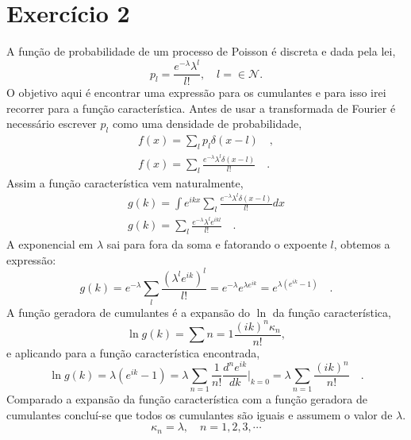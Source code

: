 \documentclass[12pt]{article}
\begin{document}
\section*{Exercício 2}
A função de probabilidade de um processo de Poisson é discreta e dada pela lei,
\begin{equation}
p_l = \frac{e^{-\lambda} \lambda^l}{l!}, \quad l=\in  \mathcal{N}.
\end{equation}
O objetivo aqui é encontrar uma expressão para os cumulantes e para isso irei recorrer para a função característica. Antes de usar a transformada de Fourier é necessário escrever $p_l$ como uma densidade de probabilidade, 
\begin{equation}
\begin{split}
f(x) = \sum_l p_l\delta(x-l) \quad,\\
f(x) = \sum_l \frac{e^{-\lambda} \lambda^l\delta(x-l)}{l!} \quad.
\end{split}
\end{equation}
Assim a função característica vem naturalmente, 
\begin{equation}
\begin{split}
g(k) = \int e^{ikx}\sum_l \frac{e^{-\lambda} \lambda^l\delta(x-l)}{l!} dx\\
g(k) = \sum_l \frac{e^{-\lambda} \lambda^l e^{ikl}}{l!} \quad.
\end{split}
\end{equation}
A exponencial em $\lambda$ sai para fora da soma e fatorando o expoente $l$, obtemos a expressão:
\begin{equation}
g(k) = e^{-\lambda}\sum_l \frac{(\lambda^l e^{ik})^l}{l!} = e^{-\lambda}e^{\lambda e^{ik}} = e^{\lambda(e^{ik} - 1)} \quad. 
\end{equation}
A função geradora de cumulantes é a expansão do $\ln$ da função característica,
\begin{equation}
\ln g(k) = \sum\limits{n=1} \frac{(ik)^n \kappa_n}{n!},
\end{equation}
e aplicando para a função característica encontrada,
\begin{equation}
\ln g(k) = \lambda(e^{ik} - 1) = \lambda\sum_{n=1} \frac{1}{n!}\frac{d^n e^{ik}}{dk}\Big\rvert_{k=0} = \lambda\sum_{n=1} \frac{(ik)^n}{n!} \quad.
\end{equation}
Comparado a expansão da função característica com a função geradora de cumulantes concluí-se que todos os cumulantes são iguais e assumem o valor de $\lambda$.
\begin{equation}
\kappa_n = \lambda, \quad n=1, 2, 3, \cdots
\end{equation}
\end{document}
